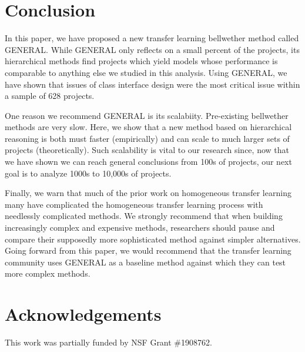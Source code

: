 \documentclass[10pt,journal,compsoc]{IEEEtran}
\begin{document}
\section{Conclusion}
\label{sec:concl}
In this paper, we have proposed a new transfer learning  bellwether method   called GENERAL.
While GENERAL only reflects on a small percent of the projects,
its hierarchical methods find projects which yield models
whose performance is comparable to anything else we studied
in this analysis.
Using GENERAL, we have shown that issues
of class interface design were the most critical
issue within a sample of 628 projects.

One reason we recommend GENERAL is its scalabiity.
Pre-existing
bellwether methods are very slow. Here, we show
that a new method based on hierarchical reasoning
is both must faster (empirically) and can scale to much
larger sets of projects (theoretically). Such scalability
is vital to our research since, now that we have shown
we can reach general conclusions from 100s of projects,
our next goal is to analyze 1000s to 10,000s of projects.



Finally, we warn that much of the prior work on homogeneous transfer learning many  have complicated the homogeneous transfer learning process with needlessly
complicated methods.
  We strongly recommend that when building increasingly complex and expensive  methods, researchers should pause and compare their supposedly more sophisticated method against simpler alternatives. Going forward from this paper, we would recommend that the transfer learning community uses GENERAL as a baseline method against which they can test more complex methods.




\section{Acknowledgements}
\label{sec:ack}

This work was partially funded by NSF Grant \#1908762.
 
\end{document}
